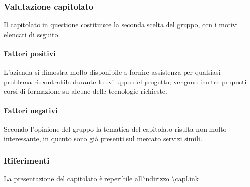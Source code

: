 \subsubsection{Valutazione capitolato}
Il capitolato in questione costituisce la seconda scelta del gruppo, con i motivi elencati di seguito.

\paragraph{Fattori positivi}

L'azienda si dimostra molto disponibile a fornire assistenza per qualsiasi problema riscontrabile durante lo sviluppo del progetto; vengono inoltre proposti corsi di formazione su alcune delle tecnologie richieste.

\paragraph{Fattori negativi}

Secondo l'opinione del gruppo la tematica del capitolato risulta non molto interessante, in quanto sono già presenti sul mercato servizi simili.

\subsubsection{Riferimenti}
La presentazione del capitolato è reperibile all'indirizzo \url{\capLink} \hfill{}